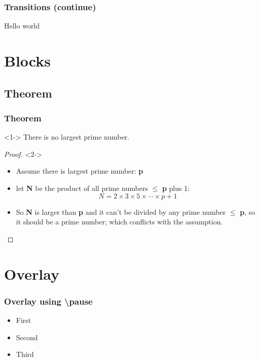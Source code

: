 \documentclass[11pt,pdf,aspectratio=43]{beamer}
\begin{document}
\begin{frame}
    \frametitle{Transitions (continue)}
    \centering
    \transboxin
    Hello world
\end{frame}

\section{Blocks}
\label{sec:blocks}

\subsection*{Theorem}
\begin{frame}
    \frametitle{Theorem}
    \begin{Theorem}<1->
	There is no largest prime number.
    \end{Theorem}

    \begin{proof}<2->
	\begin{itemize}[<+->]
	    \item Assume there is largest prime number: \textbf{p}
	    \item let \textbf{N} be the product of all prime numbers $\le$ \textbf{p} plus 1:
		\[
		    N = 2 \times 3 \times 5 \times \cdots \times p + 1
		    \]
	    \item So \textbf{N} is larger than \textbf{p} and it can't be divided 
		    by any prime number $\le$ \textbf{p}, so it should be
		    a prime number; which conflicts with the assumption.
	\end{itemize}
    \end{proof}
\end{frame}


\appendix
\section{Overlay}
\label{sec:overlay}

\begin{frame}
    \frametitle{Overlay using \textbackslash{}pause}

    \begin{itemize}
	\item First \pause
	\item Second \pause
	\item Third
    \end{itemize}

    \hyperlink{columns<1>}
    {}
\end{frame}
\end{document}
